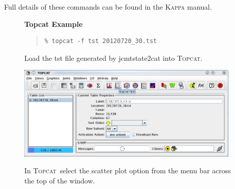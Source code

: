 \documentclass[twoside,11pt]{article}
\newcommand{\htmladdnormallink}[2]{#1}
\newenvironment{latexonly}{}{}
\newcommand{\xref}[3]{#1}
\renewcommand{\_}{\texttt{\symbol{95}}}
\newenvironment{fmpage}[1]{\begin{lrbox}{\fmbox}\begin{minipage}{#1}}{\end{minipage}\end{lrbox}\fbox{\usebox{\fmbox}}}
\newenvironment{myquote}{
   \color{MidnightBlue}\begin{quote}\begin{small}}{
   \end{small}\end{quote}
}
\newcommand{\topcat}{\htmladdnormallink{\textsc{Topcat}}{http://www.starlink.ac.uk/topcat}}
\newcommand{\task}[1]{\textsf{#1}}
\renewenvironment{myquote}{
      \begin{quote}\begin{small}}{
      \end{small}\end{quote}
   }
\begin{document}
Full details of these commands can be found in the \xref{\textsc{Kappa} manual}{sun95}{}.

\begin{latexonly}
\begin{figure}[ht!]
\begin{center}
\begin{fmpage}{0.95\linewidth}
\vspace{0.2cm}
\textbf{Topcat Example}

\vspace{0.5cm}

\begin{minipage}[c]{0.6\linewidth}

\begin{myquote}
\begin{verbatim}
% topcat -f tst 20120720_30.tst
\end{verbatim}
\end{myquote}
\end{minipage}
\hspace{0.3cm}
\begin{minipage}[c]{0.32\linewidth}
Load the tst file generated by \task{jcmtstate2cat} into \topcat.
\end{minipage}

\vspace{0.5cm}

\begin{minipage}[c]{0.6\linewidth}
\centering
\includegraphics[width=0.95\textwidth]{sc21_topcat1}

\end{minipage}
\hspace{0.3cm}
\begin{minipage}[c]{0.32\linewidth}
In \topcat\ select the scatter plot option
from the menu bar across the top of the window.
\end{minipage}

\vspace{0.5cm}


\end{fmpage}
\end{center}
\end{figure}
\end{latexonly}
\end{document}
